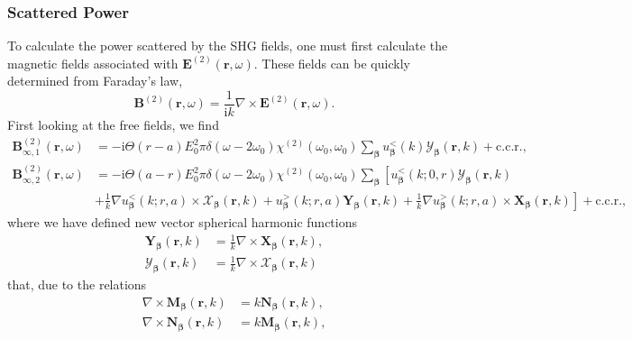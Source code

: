 \documentclass{article}
\begin{document}
\subsubsection{Scattered Power}

To calculate the power scattered by the SHG fields, one must first calculate the magnetic fields associated with $\mathbf{E}^{(2)}(\mathbf{r},\omega)$. These fields can be quickly determined from Faraday's law,
\begin{equation}
\mathbf{B}^{(2)}(\mathbf{r},\omega) = \frac{1}{\mathrm{i}k}\nabla\times\mathbf{E}^{(2)}(\mathbf{r},\omega).
\end{equation}
First looking at the free fields, we find
\begin{equation}
\begin{split}
\mathbf{B}_{\infty,1}^{(2)}(\mathbf{r},\omega) &= -\mathrm{i}\Theta(r - a)E_0^2\pi\delta(\omega - 2\omega_0)\chi^{(2)}(\omega_0,\omega_0)\sum_{\bm{\beta}}u_{\bm{\beta}}^<(k)\bm{\mathcal{Y}}_{\bm{\beta}}(\mathbf{r},k) + \mathrm{c.c.r.},\\
\mathbf{B}_{\infty,2}^{(2)}(\mathbf{r},\omega) &= -\mathrm{i}\Theta(a - r)E_0^2\pi\delta(\omega - 2\omega_0)\chi^{(2)}(\omega_0,\omega_0)\sum_{\bm{\beta}}\left[u_{\bm{\beta}}^<(k;0,r)\bm{\mathcal{Y}}_{\bm{\beta}}(\mathbf{r},k)\right.\\
&\left. + \frac{1}{k}\nabla u_{\bm{\beta}}^<(k;r,a)\times\bm{\mathcal{X}}_{\bm{\beta}}(\mathbf{r},k) +  u_{\bm{\beta}}^>(k;r,a)\mathbf{Y}_{\bm{\beta}}(\mathbf{r},k) + \frac{1}{k}\nabla u_{\bm{\beta}}^>(k;r,a)\times\mathbf{X}_{\bm{\beta}}(\mathbf{r},k)\right] + \mathrm{c.c.r.},
\end{split}
\end{equation}
where we have defined new vector spherical harmonic functions
\begin{equation}
\begin{split}
\mathbf{Y}_{\bm{\beta}}(\mathbf{r},k) &= \frac{1}{k}\nabla\times\mathbf{X}_{\bm{\beta}}(\mathbf{r},k),\\
\bm{\mathcal{Y}}_{\bm{\beta}}(\mathbf{r},k) &= \frac{1}{k}\nabla\times\bm{\mathcal{X}}_{\bm{\beta}}(\mathbf{r},k)
\end{split}
\end{equation}
that, due to the relations
\begin{equation}
\begin{split}
\nabla\times\mathbf{M}_{\bm{\beta}}(\mathbf{r},k) &= k\mathbf{N}_{\bm{\beta}}(\mathbf{r},k),\\
\nabla\times\mathbf{N}_{\bm{\beta}}(\mathbf{r},k) &= k\mathbf{M}_{\bm{\beta}}(\mathbf{r},k),
\end{split}
\end{equation}
\end{document}
